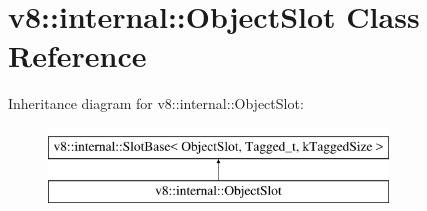 \hypertarget{classv8_1_1internal_1_1ObjectSlot}{}\section{v8\+:\+:internal\+:\+:Object\+Slot Class Reference}
\label{classv8_1_1internal_1_1ObjectSlot}
Inheritance diagram for v8\+:\+:internal\+:\+:Object\+Slot\+:\begin{figure}[H]
\begin{center}
\leavevmode
\includegraphics[height=2.000000cm]{classv8_1_1internal_1_1ObjectSlot}
\end{center}
\end{figure}
